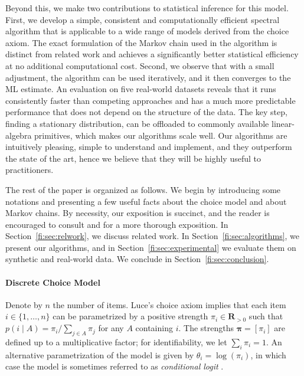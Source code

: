 Beyond this, we make two contributions to statistical inference for this model.
First, we develop a simple, consistent and computationally efficient spectral algorithm that is applicable to a wide range of models derived from the choice axiom.
The exact formulation of the Markov chain used in the algorithm is distinct from related work \citep{negahban2012iterative, azari2013generalized} and achieves a significantly better statistical efficiency at no additional computational cost.
Second, we observe that with a small adjustment, the algorithm can be used iteratively, and it then converges to the ML estimate.
An evaluation on five real-world datasets reveals that it runs consistently faster than competing approaches and has a much more predictable performance that does not depend on the structure of the data.
The key step, finding a stationary distribution, can be offloaded to commonly available linear-algebra primitives, which makes our algorithms  scale well.
Our algorithms are intuitively pleasing, simple to understand and implement, and they outperform the state of the art, hence we believe that they will be highly useful to practitioners.

The rest of the paper is organized as follows.
We begin by introducing some notations and presenting a few useful facts about the choice model and about Markov chains.
By necessity, our exposition is succinct, and the reader is encouraged to consult \citet{luce1959individual} and \citet{levin2008markov} for a more thorough exposition.
In Section~\ref{fi:sec:relwork}, we discuss related work.
In Section~\ref{fi:sec:algorithms}, we present our algorithms, and in Section~\ref{fi:sec:experimental} we evaluate them on synthetic and real-world data.
We conclude in Section~\ref{fi:sec:conclusion}.


\paragraph{Discrete Choice Model}
Denote by $n$ the number of items.
Luce's choice axiom implies that each item $i \in \{1, \ldots, n\}$ can be parametrized by a positive strength $\pi_i \in \mathbf{R}_{>0}$ such that $p(i \mid A) = \pi_i / \sum_{j \in A} \pi_j$ for any $A$ containing $i$.
The strengths $\bm{\pi} = [\pi_i]$ are defined up to a multiplicative factor;
for identifiability, we let $\sum_i \pi_i = 1$.
An alternative parametrization of the model is given by $\theta_i = \log(\pi_i)$, in which case the model is sometimes referred to as \emph{conditional logit} \citep{mcfadden1973conditional}.

